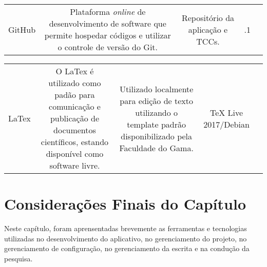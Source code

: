 \begin{table}[]
\begin{tabular}{|c|c|c|c|c}
	\cellcolor[HTML]{EFEFEF}\begin{minipage} [t] {0.3\textwidth} \centering  GitHub \cite{github2020} \end{minipage} & \cellcolor[HTML]{EFEFEF}\begin{minipage} [t] {0.3\textwidth} \centering Plataforma \emph{online} de desenvolvimento de software que permite hospedar códigos e utilizar o controle de versão do Git. \end{minipage}                                              & \cellcolor[HTML]{EFEFEF}\begin{minipage} [t] {0.2\textwidth} \centering  Repositório da aplicação e TCCs.   \end{minipage}  & \cellcolor[HTML]{EFEFEF} \begin{minipage} [t] {0.1\textwidth} \centering  2020.3.1 \end{minipage} &  \\ \cline{1-4}
\end{tabular}
\end{table}

\begin{table}[]
	\begin{tabular}{|c|c|c|c|c}
	\cline{1-4}
	\cellcolor[HTML]{EFEFEF}\begin{minipage} [t] {0.3\textwidth} \centering  LaTex \cite{latex2020} \end{minipage} & \cellcolor[HTML]{EFEFEF}\begin{minipage} [t] {0.3\textwidth} \centering O LaTex é utilizado como padão para comunicação e publicação de documentos científicos, estando disponível como software livre. \end{minipage}    & \cellcolor[HTML]{EFEFEF}\begin{minipage} [t] {0.2\textwidth} \centering  Utilizado localmente para edição de texto utilizando o template padrão disponibilizado pela Faculdade do Gama.  \end{minipage}  & \cellcolor[HTML]{EFEFEF} \begin{minipage} [t] {0.1\textwidth} \centering  TeX Live 2017/Debian \end{minipage} &  \\ \cline{1-4}
\end{tabular}
\end{table}

\section{Considerações Finais do Capítulo}

Neste capítulo, foram aprensentadas brevemente as ferramentas e tecnologias 
utilizadas no desenvolvimento do aplicativo, no gerenciamento 
do projeto, no gerenciamento de configuração, no gerenciamento da 
escrita e na condução da pesquisa.
